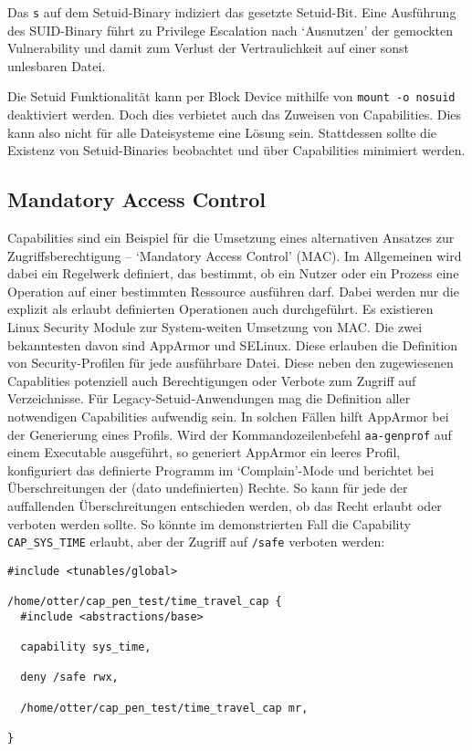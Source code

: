 Das \texttt{s} auf dem Setuid-Binary indiziert das gesetzte Setuid-Bit. Eine Ausführung des SUID-Binary führt zu Privilege Escalation nach `Ausnutzen' der gemockten Vulnerability und damit zum Verlust der Vertraulichkeit auf einer sonst unlesbaren Datei.

Die Setuid Funktionalität kann per Block Device mithilfe von \texttt{mount -o nosuid} deaktiviert werden. Doch dies verbietet auch das Zuweisen von Capabilities. Dies kann also nicht für alle Dateisysteme eine Lösung sein. Stattdessen sollte
die Existenz von Setuid-Binaries beobachtet und über Capabilities minimiert werden.

\subsection{Mandatory Access Control}

Capabilities sind ein Beispiel für die Umsetzung eines alternativen Ansatzes zur Zugriffsberechtigung -- `Mandatory Access Control' (MAC). Im Allgemeinen wird dabei ein Regelwerk definiert, das bestimmt, ob ein Nutzer oder ein Prozess eine Operation auf einer bestimmten Ressource ausführen darf. Dabei werden nur die explizit als erlaubt definierten Operationen auch durchgeführt. Es existieren Linux Security Module zur System-weiten Umsetzung von MAC. Die zwei bekanntesten davon
sind AppArmor und SELinux. Diese erlauben die Definition von Security-Profilen für jede ausführbare Datei. Diese neben den zugewiesenen Capablities potenziell auch Berechtigungen oder Verbote zum Zugriff auf Verzeichnisse. Für Legacy-Setuid-Anwendungen mag die Definition aller notwendigen Capabilities aufwendig sein. In solchen Fällen hilft AppArmor bei der Generierung eines Profils. Wird der Kommandozeilenbefehl \texttt{aa-genprof} auf einem Executable ausgeführt, so generiert
AppArmor ein leeres Profil, konfiguriert das definierte Programm im `Complain'-Mode und berichtet bei Überschreitungen der (dato undefinierten) Rechte. So kann für jede der auffallenden Überschreitungen entschieden werden, ob das Recht erlaubt oder verboten werden sollte. So könnte im demonstrierten Fall die Capability \texttt{CAP\_SYS\_TIME} erlaubt, aber der Zugriff auf \texttt{/safe} verboten werden:

\begin{lstlisting}
#include <tunables/global>

/home/otter/cap_pen_test/time_travel_cap {
  #include <abstractions/base>

  capability sys_time,

  deny /safe rwx,

  /home/otter/cap_pen_test/time_travel_cap mr,

}
\end{lstlisting}

